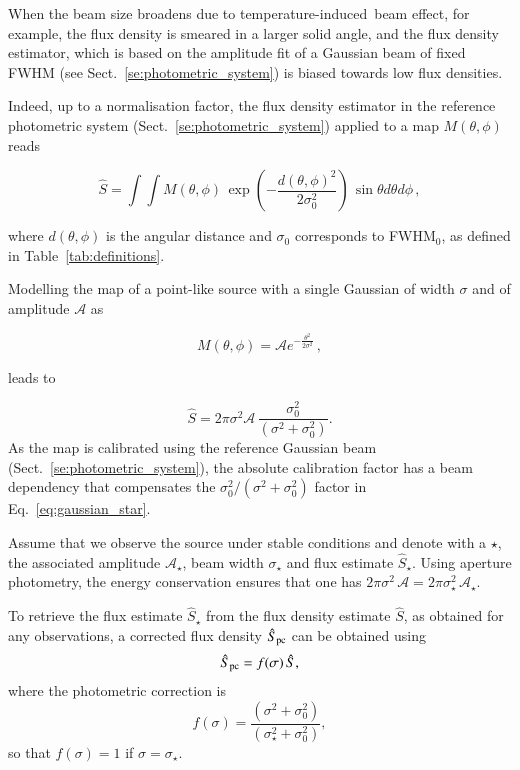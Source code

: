 \documentclass[traditionalabstract]{aa}
\newcommand{\afternoon}{temperature-induced}
\begin{document}
{\begin{appendix}
When the beam size broadens due to \afternoon\ beam effect, for example, the flux
density is smeared in a larger solid angle, and the flux density estimator, which
is based on the amplitude fit of a Gaussian beam of fixed FWHM (see
Sect.~\ref{se:photometric_system}) is biased towards low flux
densities.

Indeed, up to a normalisation factor, the flux density
estimator in the reference photometric system (Sect.~\ref{se:photometric_system}) applied to a map
$M(\theta,\phi)$ reads

\begin{equation}
  \hat{S}  = \int \int M(\theta, \phi)\, \exp{\left(-\frac{d(\theta,\phi)^{2}}{2\sigma_{0}^{2}}\right)}\,  \sin \theta d\theta d\phi\,,
  \label{eq:flux_density_estimator}
\end{equation}

where $d(\theta,\phi)$ is the angular distance and $\sigma_0$
corresponds to FWHM$_0$, 
as defined in Table~\ref{tab:definitions}.

Modelling the map of a point-like source with a single Gaussian of
width $\sigma$ and of amplitude $\mathcal{A}$ as

\begin{equation}
  M(\theta, \phi) = \mathcal{A} e^{-\frac{\theta^{2}}{2\sigma^2}}\,,
  \label{eq:pointsource_map}
\end{equation}

leads to

\begin{equation}
  \hat{S}  = 2\pi \sigma^2 \mathcal{A} \,  \frac{\sigma_0^2}{(\sigma^2 + \sigma_0^2)}.
  \label{eq:gaussian_star}
\end{equation}
As the map is calibrated using the reference Gaussian beam
(Sect.~\ref{se:photometric_system}), the absolute calibration factor %
has a beam dependency that compensates the
$\sigma_0^2/(\sigma^2 + \sigma_0^2)$ factor in Eq.~\ref{eq:gaussian_star}.

Assume that we observe the source under stable conditions and
denote with a $\star$, the associated amplitude $\mathcal{A}_\star$, beam width
$\sigma_\star$ and flux estimate $\hat{S}_\star$. Using aperture
photometry, the energy conservation ensures that one has
$2\pi\sigma^2 \, \mathcal{A} = 2\pi\sigma_\star^2 \, \mathcal{A_\star}$.

To retrieve the flux estimate $\hat{S}_\star$ from the flux density
estimate $\hat{S}$, as obtained for any observations, a
corrected flux density $\hat{S}_{\rm{pc}}$ can be obtained using 
\begin{equation}
  \hat{S}_{\rm{pc}} = f(\sigma) \, \hat{S},
\end{equation} 
where the photometric correction is 
\begin{equation}
  f(\sigma) = \frac{(\sigma^2 + \sigma_0^2)}{(\sigma_\star^2+\sigma_0^2)}, 
\end{equation} 
so that $f(\sigma) = 1$ if $\sigma=\sigma_\star$.


\end{appendix}}
\end{document}
